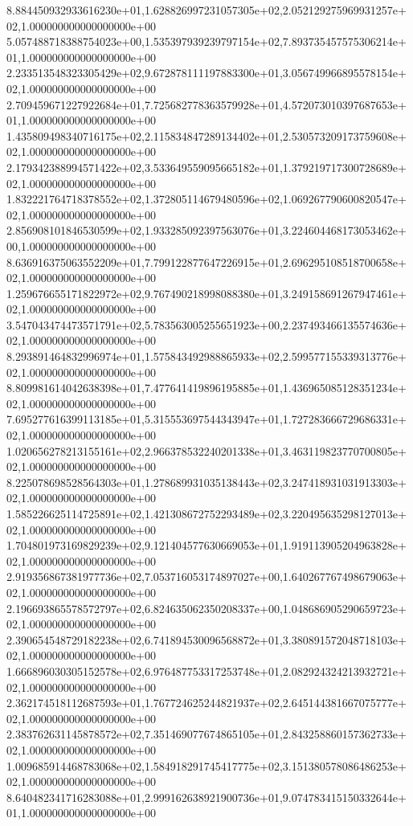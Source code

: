 8.884450932933616230e+01,1.628826997231057305e+02,2.052129275969931257e+02,1.000000000000000000e+00
5.057488718388754023e+00,1.535397939239797154e+02,7.893735457575306214e+01,1.000000000000000000e+00
2.233513548323305429e+02,9.672878111197883300e+01,3.056749966895578154e+02,1.000000000000000000e+00
2.709459671227922684e+01,7.725682778363579928e+01,4.572073010397687653e+01,1.000000000000000000e+00
1.435809498340716175e+02,2.115834847289134402e+01,2.530573209173759608e+02,1.000000000000000000e+00
2.179342388994571422e+02,3.533649559095665182e+01,1.379219717300728689e+02,1.000000000000000000e+00
1.832221764718378552e+02,1.372805114679480596e+02,1.069267790600820547e+02,1.000000000000000000e+00
2.856908101846530599e+02,1.933285092397563076e+01,3.224604468173053462e+00,1.000000000000000000e+00
8.636916375063552209e+01,7.799122877647226915e+01,2.696295108518700658e+02,1.000000000000000000e+00
1.259676655171822972e+02,9.767490218998088380e+01,3.249158691267947461e+02,1.000000000000000000e+00
3.547043474473571791e+02,5.783563005255651923e+00,2.237493466135574636e+02,1.000000000000000000e+00
8.293891464832996974e+01,1.575843492988865933e+02,2.599577155339313776e+02,1.000000000000000000e+00
8.809981614042638398e+01,7.477641419896195885e+01,1.436965085128351234e+02,1.000000000000000000e+00
7.695277616399113185e+01,5.315553697544343947e+01,1.727283666729686331e+02,1.000000000000000000e+00
1.020656278213155161e+02,2.966378532240201338e+01,3.463119823770700805e+02,1.000000000000000000e+00
8.225078698528564303e+01,1.278689931035138443e+02,3.247418931031913303e+02,1.000000000000000000e+00
1.585226625114725891e+02,1.421308672752293489e+02,3.220495635298127013e+02,1.000000000000000000e+00
1.704801973169829239e+02,9.121404577630669053e+01,1.919113905204963828e+02,1.000000000000000000e+00
2.919356867381977736e+02,7.053716053174897027e+00,1.640267767498679063e+02,1.000000000000000000e+00
2.196693865578572797e+02,6.824635062350208337e+00,1.048686905290659723e+02,1.000000000000000000e+00
2.390654548729182238e+02,6.741894530096568872e+01,3.380891572048718103e+02,1.000000000000000000e+00
1.666896030305152578e+02,6.976487753317253748e+01,2.082924324213932721e+02,1.000000000000000000e+00
2.362174518112687593e+01,1.767724625244821937e+02,2.645144381667075777e+02,1.000000000000000000e+00
2.383762631145878572e+02,7.351469077674865105e+01,2.843258860157362733e+02,1.000000000000000000e+00
1.009685914468783068e+02,1.584918291745417775e+02,3.151380578086486253e+02,1.000000000000000000e+00
8.640482341716283088e+01,2.999162638921900736e+01,9.074783415150332644e+01,1.000000000000000000e+00
